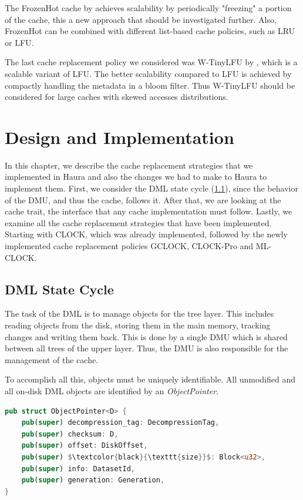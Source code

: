 \documentclass[
	12pt,
	a4paper,
	abstract,
	bibliography=totoc,
	chapterprefix,
	headings=openright,
	numbers=endperiod,
	parskip=half,
	twoside,
]{scrreprt}
\begin{document}
The FrozenHot cache by \cite{qiu2023frozenhot} achieves scalability by periodically "freezing" 
a portion of the cache, this a new approach that should be investigated further. 
Also, FrozenHot can be combined with different list-based cache policies, such as LRU or LFU.

The last cache replacement policy we considered was W-TinyLFU by \cite{einziger2017tinylfu},
which is a scalable variant of LFU.
The better scalability compared to LFU is achieved by compactly handling the metadata in a bloom filter.
Thus W-TinyLFU should be considered for large caches with skewed accesses distributions.


\chapter{Design and Implementation}
\label{cha:design and implementation}

In this chapter, we describe the cache replacement strategies that we implemented in Haura 
and also the changes we had to make to Haura to implement them.
First, we consider the DML state cycle (\cref{sec:dml state cycle}), 
since the behavior of the DMU, and thus the cache, follows it.
After that, we are looking at the cache trait, the interface that any cache implementation must follow.
Lastly, we examine all the cache replacement strategies that have been implemented.
Starting with CLOCK, which was already implemented,
followed by the newly implemented cache replacement policies GCLOCK, CLOCK-Pro and ML-CLOCK.

\section{DML State Cycle}
\label{sec:dml state cycle}

The task of the DML is to manage objects for the tree layer. 
This includes reading objects from the disk, storing them in the main memory, tracking changes and writing them back.
This is done by a single DMU which is shared between all trees of the upper layer.
Thus, the DMU is also responsible for the management of the cache.

To accomplish all this, objects must be uniquely identifiable.
All unmodified and all on-disk DML objects are identified by an \emph{ObjectPointer}.

\bigskip

\begin{lstlisting}[language=Rust,mathescape=true,caption=ObjectPointer struct ,label=lst:ObjectPointer struct]
pub struct ObjectPointer<D> {
    pub(super) decompression_tag: DecompressionTag,
    pub(super) checksum: D,
    pub(super) offset: DiskOffset,
    pub(super) $\textcolor{black}{\texttt{size}}$: Block<u32>,
    pub(super) info: DatasetId,
    pub(super) generation: Generation,
}
\end{lstlisting}
\end{document}
